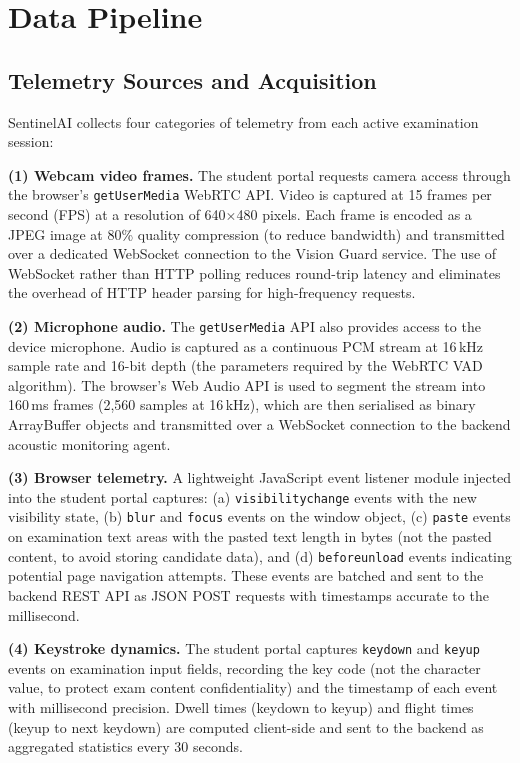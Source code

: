 
\section{Data Pipeline}

\subsection{Telemetry Sources and Acquisition}

SentinelAI collects four categories of telemetry from each active examination session:

\textbf{(1) Webcam video frames.} The student portal requests camera access through the browser's \texttt{getUserMedia} WebRTC API. Video is captured at 15 frames per second (FPS) at a resolution of 640$\times$480 pixels. Each frame is encoded as a JPEG image at 80\% quality compression (to reduce bandwidth) and transmitted over a dedicated WebSocket connection to the Vision Guard service. The use of WebSocket rather than HTTP polling reduces round-trip latency and eliminates the overhead of HTTP header parsing for high-frequency requests.

\textbf{(2) Microphone audio.} The \texttt{getUserMedia} API also provides access to the device microphone. Audio is captured as a continuous PCM stream at 16\,kHz sample rate and 16-bit depth (the parameters required by the WebRTC VAD algorithm). The browser's Web Audio API is used to segment the stream into 160\,ms frames (2,560 samples at 16\,kHz), which are then serialised as binary ArrayBuffer objects and transmitted over a WebSocket connection to the backend acoustic monitoring agent.

\textbf{(3) Browser telemetry.} A lightweight JavaScript event listener module injected into the student portal captures: (a) \texttt{visibilitychange} events with the new visibility state, (b) \texttt{blur} and \texttt{focus} events on the window object, (c) \texttt{paste} events on examination text areas with the pasted text length in bytes (not the pasted content, to avoid storing candidate data), and (d) \texttt{beforeunload} events indicating potential page navigation attempts. These events are batched and sent to the backend REST API as JSON POST requests with timestamps accurate to the millisecond.

\textbf{(4) Keystroke dynamics.} The student portal captures \texttt{keydown} and \texttt{keyup} events on examination input fields, recording the key code (not the character value, to protect exam content confidentiality) and the timestamp of each event with millisecond precision. Dwell times (keydown to keyup) and flight times (keyup to next keydown) are computed client-side and sent to the backend as aggregated statistics every 30 seconds.

